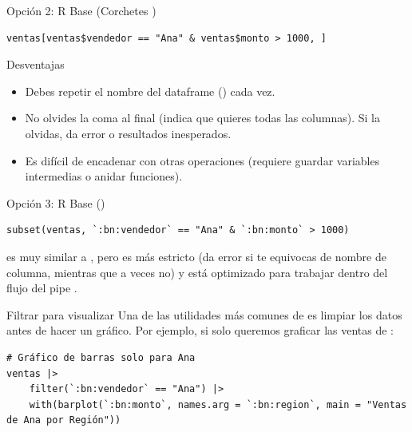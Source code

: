 \documentclass[8pt]{beamer}
\begin{document}
\begin{frame}[fragile]
Opción 2: R Base (Corchetes \rscript{[]})
\begin{lstlisting}[style=RScript]
ventas[ventas$vendedor == "Ana" & ventas$monto > 1000, ]
\end{lstlisting}

Desventajas
\begin{itemize}
	\item Debes repetir el nombre del dataframe () cada vez.
	\item No olvides la coma al final \rscript{..., ]} (indica que quieres todas las columnas). Si la olvidas, da error o resultados inesperados.
	\item Es difícil de encadenar con otras operaciones (requiere guardar variables intermedias o anidar funciones).
\end{itemize}
\end{frame}




\begin{frame}[fragile]
Opción 3: R Base ()
\begin{lstlisting}[style=RScript]
subset(ventas, `:bn:vendedor` == "Ana" & `:bn:monto` > 1000)
\end{lstlisting}

\begin{block}{}
	 es muy similar a , pero  es más estricto (da error si te equivocas de nombre de columna, mientras que  a veces no) y está optimizado para trabajar dentro del flujo del pipe \rscript{|>}.
\end{block}
\end{frame}




\begin{frame}[fragile]{Filtrar para visualizar}
Una de las utilidades más comunes de  es limpiar los datos antes de hacer un gráfico. Por ejemplo, si solo queremos graficar las ventas de :
\begin{lstlisting}[style=RScript]
# Gráfico de barras solo para Ana
ventas |>
	filter(`:bn:vendedor` == "Ana") |>
	with(barplot(`:bn:monto`, names.arg = `:bn:region`, main = "Ventas de Ana por Región"))
\end{lstlisting}
\end{frame}
\end{document}

